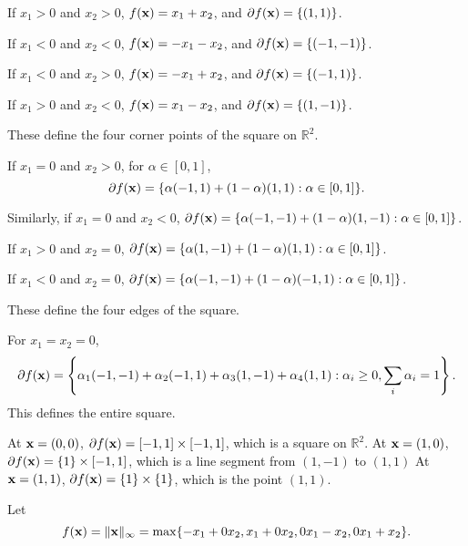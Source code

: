 \documentclass{scrartcl}
\begin{document}
If $x_1 > 0$ and $x_2 > 0$, $f(\mathbf{x}) =x_1+x_2 $, and $\partial f(\mathbf{x}) = \{ (1,1) \}$.

If $x_1 < 0$ and $x_2 < 0$, $f(\mathbf{x}) = -x_1-x_2$, and $\partial f(\mathbf{x}) = \{ (-1,-1) \}$.

If $x_1 < 0$ and $x_2 > 0$, $f(\mathbf{x}) = -x_1+x_2$, and $\partial f(\mathbf{x}) = \{ (-1,1) \}$.

If $x_1 > 0$ and $x_2 < 0$, $f(\mathbf{x}) = x_1-x_2$, and $\partial f(\mathbf{x}) = \{ (1,-1) \}$.

These define the four corner points of the square on $\mathbb{R}^2$.

If $x_1 = 0$ and $x_2 > 0$, for $\alpha \in [0,1]$,
\begin{equation}
\partial f(\mathbf{x}) = \{\alpha (-1,1) + (1-\alpha) (1,1) : \alpha \in [0, 1]\}.
\end{equation}

Similarly, if $x_1 = 0$ and $x_2 < 0$, $\partial f(\mathbf{x}) = \{\alpha (-1,-1) + (1-\alpha) (1,-1) : \alpha \in [0, 1]\}$.

If $x_1 > 0$ and $x_2 = 0$, $\partial f(\mathbf{x}) = \{\alpha (1,-1) + (1-\alpha) (1,1) : \alpha \in [0, 1]\}$.

If $x_1 < 0$ and $x_2 = 0$, $\partial f(\mathbf{x}) = \{\alpha (-1,-1) + (1-\alpha) (-1,1) : \alpha \in [0, 1]\}$.

These define the four edges of the square.

For $x_1 = x_2 = 0$,
\begin{equation}
\partial f(\mathbf{x}) = \left\lbrace \alpha_1 (-1,-1) + \alpha_2 (-1,1) + \alpha_3(1,-1) + \alpha_4 (1,1):  \alpha_i \ge 0, \sum_i \alpha_i = 1 \right\rbrace.
\end{equation}
This defines the entire square.

At $\mathbf{x} = (0,0)$, $\partial f(\mathbf{x}) = [-1,1] \times [-1,1]$, which is a square on $\mathbb{R}^2$.
At $\mathbf{x} = (1,0)$, $\partial f(\mathbf{x}) = \{1\} \times [-1,1]$, which is a line segment from $(1,-1)$ to $(1,1)$
At $\mathbf{x} = (1,1)$, $\partial f(\mathbf{x}) = \{1\} \times \{1\}$, which is the point $(1,1)$.

Let
\begin{equation}
f(\mathbf{x}) = \| \mathbf{x} \|_\infty = \max \{-x_1+ 0 x_2, x_1+ 0 x_2, 0 x_1-x_2,  0 x_1+x_2\}.
\end{equation}
\end{document}
